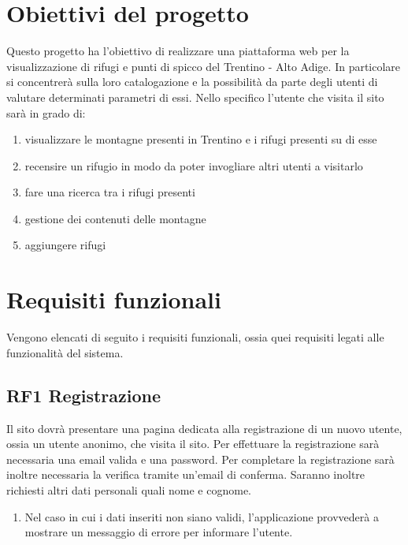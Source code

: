 \documentclass[a4paper,12pt]{article}
\begin{document}
\section{Obiettivi del progetto}

Questo progetto ha l’obiettivo di realizzare una piattaforma web per la visualizzazione di rifugi e punti di spicco del Trentino - Alto Adige. In particolare si concentrerà sulla loro catalogazione e la possibilità da parte degli utenti di valutare determinati parametri di essi. 
Nello specifico l'utente che visita il sito sarà in grado di:

\begin{enumerate}
    \item visualizzare le montagne presenti in Trentino e i rifugi presenti su di esse
    \item recensire un rifugio in modo da poter invogliare altri utenti a visitarlo
    \item fare una ricerca tra i rifugi presenti
    \item gestione dei contenuti delle montagne
    \item aggiungere rifugi

\end{enumerate}
    
\newpage

\section{Requisiti funzionali}

Vengono elencati di seguito i requisiti funzionali, ossia quei requisiti legati alle funzionalità del sistema.


\subsection*{RF1 Registrazione}
Il sito dovrà presentare una pagina dedicata alla registrazione di un nuovo utente, ossia un utente anonimo, che visita il sito. Per effettuare la registrazione sarà necessaria una email valida e una password. Per completare la registrazione sarà inoltre necessaria la verifica tramite un'email di conferma.
Saranno inoltre richiesti altri dati personali quali nome e cognome.
\begin{enumerate} [leftmargin=40pt]
    \item Nel caso in cui i dati inseriti non siano validi, l'applicazione provvederà a mostrare un messaggio di errore per informare l'utente. 
\end{enumerate}
\end{document}
